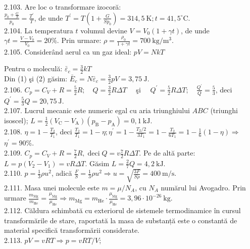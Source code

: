 \documentclass[10pt]{article}
\begin{document}
2.103. Are loc o transformare izocoră:\\
$\frac{p_{0}+\frac{G}{S}}{p_{0}}=\frac{T^{\prime}}{T}$, de unde $T^{\prime}=T\left(1+\frac{G}{S p_{0}}\right)=314,5 \mathrm{~K} ; t=41,5^{\circ} \mathrm{C}$.\\
2.104. La temperatura $t$ volumul devine $V=V_{0}(1+\gamma t)$, de unde $\gamma t=\frac{V-V_{0}}{V_{0}}=20 \%$. Prin urmare: $\rho=\frac{\rho_{0}}{1+\gamma t}=700 \mathrm{~kg} / \mathrm{m}^{3}$.\\
2.105. Considerând aerul ca un gaz ideal: $p V=N k T$

Pentru o moleculă: $\bar{\varepsilon}_{c}=\frac{3}{2} k T$\\
Din (1) şi (2) găsim: $\bar{E}_{c}=N \bar{\varepsilon}_{c}=\frac{3}{2} p V=3,75 \mathrm{~J}$.\\
2.106. $C_{p}=C_{V}+R=\frac{5}{2} R ; \quad Q=\frac{3}{2} R \Delta T \quad$ şi $\quad Q^{\prime}=\frac{5}{2} R \Delta T ; \quad \frac{Q^{\prime}}{Q}=\frac{5}{3}$, deci $Q^{\prime}=\frac{5}{3} Q=20,75 \mathrm{~J}$.\\
2.107. Lucrul mecanic este numeric egal cu aria triunghiului $A B C$ (triunghi isoscel); $L=\frac{1}{2}\left(V_{\mathrm{C}}-V_{\mathrm{A}}\right)\left(p_{\mathrm{B}}-p_{\mathrm{A}}\right)=0,1 \mathrm{~kJ}$.\\
2.108. $\eta=1-\frac{T_{2}}{T_{1}}$, deci $\frac{T_{2}}{T_{1}}=1-\eta ; \eta^{\prime}=1-\frac{T_{2} / 2}{3 T_{1}}=1-\frac{T_{2}}{6 T_{1}}=1-\frac{1}{6}(1-\eta) \Rightarrow$ $\eta^{\prime}=90 \%$.\\
2.109. $C_{p}=C_{V}+R=\frac{7}{2} R, \operatorname{deci} Q=v \frac{7}{2} R \Delta T$. Pe de altă parte: $L=p\left(V_{2}-V_{1}\right)=v R \Delta T$. Găsim $L=\frac{2}{7} Q=4,2 \mathrm{~kJ}$.\\
2.110. $p=\frac{1}{3} \rho u^{2}$, adică $\frac{F}{S}=\frac{1}{3} \rho u^{2} \Rightarrow u=\sqrt{\frac{3 F}{S \rho}}=400 \mathrm{~m} / \mathrm{s}$.\\
2.111. Masa unei molecule este $m=\mu / N_{A}$, cu $N_{A}$ numărul lui Avogadro. Prin urmare $\frac{m_{\mathrm{Mg}}}{m_{\mathrm{He}}}=\frac{\mu_{\mathrm{Mg}}}{\mu_{\mathrm{He}}} \Rightarrow m_{\mathrm{Mg}}=m_{\mathrm{He}} \cdot \frac{\mu_{\mathrm{Mg}}}{\mu_{\mathrm{He}}}=3,96 \cdot 10^{-26} \mathrm{~kg}$.\\
2.112. Căldura schimbată cu exteriorul de sistemele termodinamice în cursul transformările de stare, raportată la masa de substanță este o constantă de material specifică transformării considerate.\\
2.113. $p V=v R T \Rightarrow p=v R T / V$;
\end{document}
